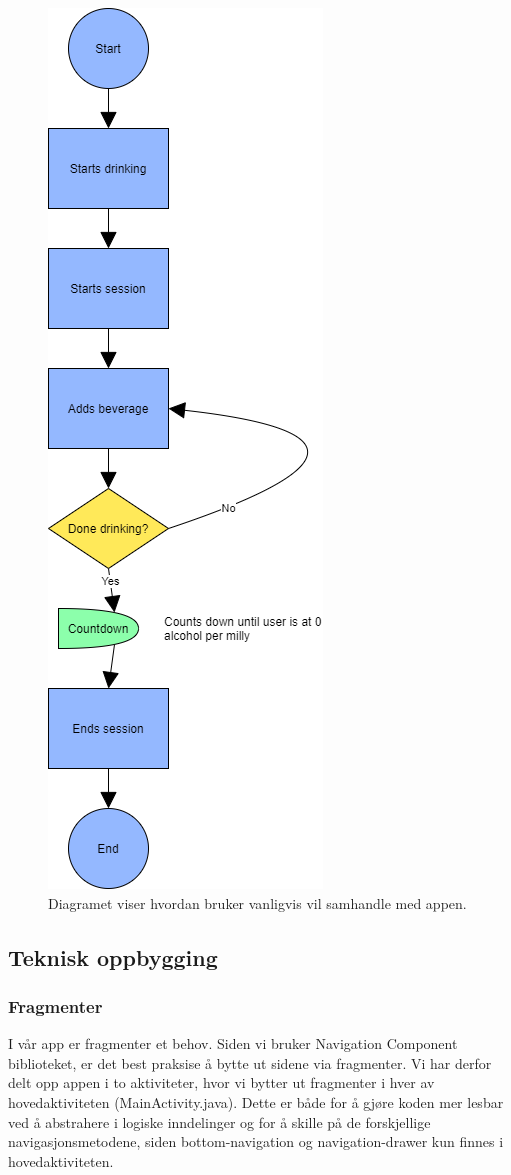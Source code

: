 \begin{figure}[H]
    \centering
    \includegraphics[scale=0.4]{images/lille_promille_user_float.drawio.png}
    \caption{Diagramet viser hvordan bruker vanligvis vil samhandle med appen.}
\end{figure}

\subsection{Teknisk oppbygging}
\subsubsection{Fragmenter}
I vår app er fragmenter et behov. Siden vi bruker Navigation Component biblioteket, er det best praksise å bytte ut sidene via fragmenter. Vi har derfor delt opp appen i to aktiviteter, hvor vi bytter ut fragmenter i hver av hovedaktiviteten (MainActivity.java). Dette er både for å gjøre koden mer lesbar ved å abstrahere i logiske inndelinger og for å skille på de forskjellige navigasjonsmetodene, siden bottom-navigation og navigation-drawer kun finnes i hovedaktiviteten.

